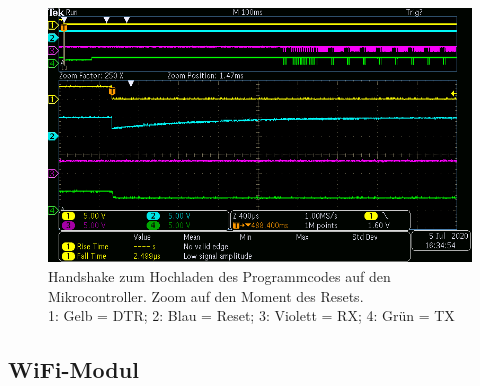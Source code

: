 \begin{figure}[H]
\center
\includegraphics[width =  \textwidth]{graphics/ATMega2560_DTR_RESET_RX_TX_1}
\caption{Handshake zum Hochladen des Programmcodes auf den Mikrocontroller. Zoom auf den Moment des Resets.\\\hspace{\textwidth}1: Gelb = DTR; 2: Blau = Reset; 3: Violett = RX; 4: Grün = TX}
\label{fig:ATMega2560_DTR_RESET_RX_TX_1}
\end{figure}


\subsection{WiFi-Modul}\label{Appendix:Handshake_ESP}

